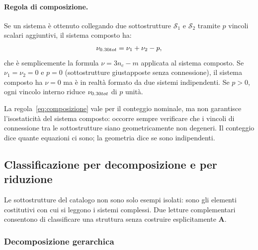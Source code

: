 \paragraph{Regola di composizione.}
Se un sistema è ottenuto collegando due sottostrutture
$\mathcal{S}_1$ e $\mathcal{S}_2$ tramite $p$ vincoli scalari
aggiuntivi, il sistema composto ha:
\begin{equation}\label{eq:composizione}
	\nu_{\rm tot} = \nu_1 + \nu_2 - p,
\end{equation}
che è semplicemente la formula $\nu = 3n_c - m$ applicata
al sistema composto. Se $\nu_1 = \nu_2 = 0$ e $p = 0$
(sottostrutture giustapposte senza connessione), il sistema
composto ha $\nu = 0$ ma è in realtà formato da due sistemi
indipendenti. Se $p > 0$, ogni vincolo interno riduce
$\nu_{\rm tot}$ di $p$ unità.

\begin{oss}
	La regola~\eqref{eq:composizione} vale per il
	conteggio nominale, ma non garantisce
	l'isostaticità del sistema composto: occorre
	sempre verificare che i vincoli di connessione
	tra le sottostrutture siano geometricamente
	non degeneri. Il conteggio dice quante equazioni
	ci sono; la geometria dice se sono indipendenti.
\end{oss}


\subsection{Classificazione per decomposizione e per riduzione}
\label{sec:decomposizione_riduzione}

Le sottostrutture del catalogo non sono solo esempi isolati:
sono gli elementi costitutivi con cui si leggono i sistemi
complessi. Due letture complementari consentono di classificare
una struttura senza costruire esplicitamente $\bm{A}$.

\subsubsection{Decomposizione gerarchica}
\label{sec:gerarchia}

